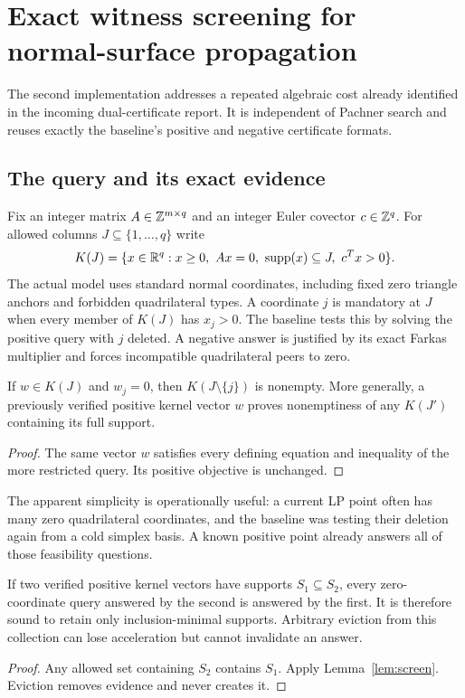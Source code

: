 \section{Exact witness screening for normal-surface propagation}\label{sec:witness}

The second implementation addresses a repeated algebraic cost already
identified in the incoming dual-certificate report. It is independent of
Pachner search and reuses exactly the baseline's positive and negative
certificate formats.

\subsection{The query and its exact evidence}

Fix an integer matrix $A\in\mathbb Z^{m\times q}$ and an integer Euler covector
$c\in\mathbb Z^q$. For allowed columns $J\subseteq\{1,\ldots,q\}$ write
\[
 K(J)=\{x\in\R^q:x\ge0,\ Ax=0,\ \supp(x)\subseteq J,\ c^Tx>0\}.
\]
The actual model uses standard normal coordinates, including fixed zero
triangle anchors and forbidden quadrilateral types. A coordinate $j$ is
mandatory at $J$ when every member of $K(J)$ has $x_j>0$. The baseline
tests this by solving the positive query with $j$ deleted. A negative
answer is justified by its exact Farkas multiplier and forces incompatible
quadrilateral peers to zero.

\begin{lemma}\label{lem:screen}
If $w\in K(J)$ and $w_j=0$, then $K(J\setminus\{j\})$ is nonempty.
More generally, a previously verified positive kernel vector $w$ proves
nonemptiness of any $K(J')$ containing its full support.
\end{lemma}
\begin{proof}
The same vector $w$ satisfies every defining equation and inequality of
the more restricted query. Its positive objective is unchanged.
\end{proof}

The apparent simplicity is operationally useful: a current LP point often
has many zero quadrilateral coordinates, and the baseline was testing their
deletion again from a cold simplex basis. A known positive point already
answers all of those feasibility questions.

\begin{proposition}\label{prop:antichain}
If two verified positive kernel vectors have supports $S_1\subseteq S_2$,
every zero-coordinate query answered by the second is answered by the first.
It is therefore sound to retain only inclusion-minimal supports. Arbitrary
eviction from this collection can lose acceleration but cannot invalidate
an answer.
\end{proposition}
\begin{proof}
Any allowed set containing $S_2$ contains $S_1$. Apply
Lemma~\ref{lem:screen}. Eviction removes evidence and never creates it.
\end{proof}

